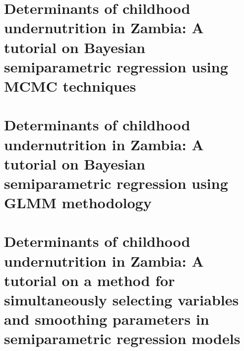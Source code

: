 \documentclass[11pt,a4paper,twoside]{bayesxreport}
\begin{document}
\MakeShortVerb{\|}


\newpage

\chapter[A tutorial
on Bayesian semiparametric regression using MCMC
techniques]{Determinants of childhood undernutrition in Zambia: A
tutorial on Bayesian semiparametric regression using MCMC
techniques} \label{zambiaanalysis}



\chapter[A tutorial
on Bayesian semiparametric regression using GLMM
methodology]{Determinants of childhood undernutrition in Zambia: A
tutorial on Bayesian semiparametric regression using GLMM
methodology} \label{remlregzambiaanalysis}



\chapter[Simultaneously selecting variables and smoothing parameters] {Determinants of childhood undernutrition in Zambia: A
tutorial on a method for simultaneously selecting variables and
smoothing parameters in semiparametric regression models}
\label{zambia_step_analysis}




\end{document}
